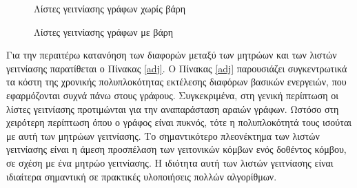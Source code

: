 \documentclass[12pt,twoside]{article}
\newcommand{\gr}{\selectlanguage{greek}}
\begin{document}
\gr
\begin{figure}[h]
\centering
{}
	\hfil
\caption{Λίστες γειτνίασης γράφων χωρίς βάρη}
\label{list1}
\end{figure}

\begin{figure}[!ht]
\centering
{}
	\hfil
\caption{Λίστες γειτνίασης γράφων με βάρη}
\label{list2}
\end{figure}

Για την περαιτέρω κατανόηση των διαφορών μεταξύ των μητρώων και των λιστών γειτνίασης παρατίθεται ο Πίνακας \ref{adj}. Ο Πίνακας \ref{adj} παρουσιάζει συγκεντρωτικά τα κόστη της χρονικής πολυπλοκότητας εκτέλεσης διαφόρων βασικών ενεργειών, που εφαρμόζονται συχνά πάνω στους γράφους. Συγκεκριμένα, στη γενική περίπτωση οι λίστες γειτνίασης προτιμώνται για την αναπαράσταση αραιών γράφων. Ωστόσο στη χειρότερη περίπτωση όπου ο γράφος είναι πυκνός, τότε η πολυπλοκότητά τους ισούται με αυτή των μητρώων γειτνίασης. Το σημαντικότερο πλεονέκτημα των λιστών γειτνίασης είναι η άμεση προσπέλαση των γειτονικών κόμβων ενός δοθέντος κόμβου, σε σχέση με ένα μητρώο γειτνίασης. Η ιδιότητα αυτή των λιστών γειτνίασης είναι ιδιαίτερα σημαντική σε πρακτικές υλοποιήσεις πολλών αλγορίθμων. 
\end{document}

